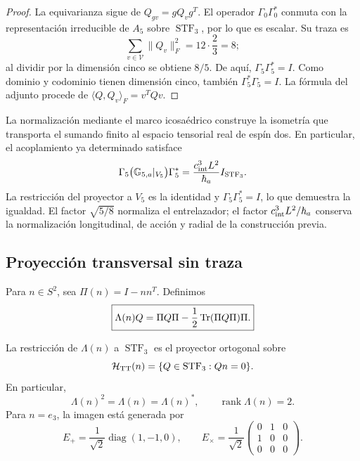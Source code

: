 \begin{proof}
La equivarianza sigue de \(Q_{gv}=gQ_vg^T\). El operador
\(\Gamma_0\Gamma_0^*\) conmuta con la representaci\'on irreducible de
\(A_5\) sobre \(\operatorname{STF}_3\), por lo que es escalar. Su traza
es
\[
\sum_{v\in\mathcal V}\|Q_v\|_F^2
=12\cdot\frac23=8;
\]
al dividir por la dimensi\'on cinco se obtiene \(8/5\). De aqu\'i,
\(\Gamma_5\Gamma_5^*=I\). Como dominio y codominio tienen dimensi\'on
cinco, tambi\'en \(\Gamma_5^*\Gamma_5=I\). La f\'ormula del adjunto
procede de \(\langle Q,Q_v\rangle_F=v^TQv\).
\end{proof}

La normalización mediante el marco icosaédrico construye la isometría que
transporta el sumando finito al espacio tensorial real de espín dos.
En particular, el acoplamiento ya determinado satisface
\begin{equation}
 \Gamma_5\bigl(\mathbb G_{5,a}|_{V_5}\bigr)\Gamma_5^*
 =\frac{c_{\rm int}^3L^2}{\hbar_a}I_{\operatorname{STF}_3}.
 \label{eq:ii-g26-normalizacion-tensorial}
\end{equation}
La restricción del proyector a \(V_5\) es la identidad y
\(\Gamma_5\Gamma_5^*=I\), lo que demuestra la igualdad. El factor
\(\sqrt{5/8}\) normaliza el entrelazador; el factor
\(c_{\rm int}^3L^2/\hbar_a\) conserva la normalización longitudinal,
de acción y radial de la construcción previa.

\subsection{Proyecci\'on transversal sin traza}

Para \(n\in S^2\), sea \(\Pi(n)=I-nn^T\). Definimos
\begin{equation}
\label{ii:pent:eq:gravity-lambda-tt}
\boxed{
\Lambda(n)Q
=\Pi Q\Pi-\frac12\operatorname{Tr}(\Pi Q\Pi)\Pi.}
\end{equation}

\begin{theorem}
\label{ii:pent:thm:gravity-tt}
La restricci\'on de \(\Lambda(n)\) a \(\operatorname{STF}_3\) es el
proyector ortogonal sobre
\begin{equation}
\label{ii:pent:eq:gravity-htt}
\mathcal H_{\rm TT}(n)
=\{Q\in\operatorname{STF}_3:Qn=0\}.
\end{equation}
En particular,
\begin{equation}
\label{ii:pent:eq:gravity-lambda-properties}
\Lambda(n)^2=\Lambda(n)=\Lambda(n)^*,
\qquad \operatorname{rank}\Lambda(n)=2.
\end{equation}
Para \(n=e_3\), la imagen est\'a generada por
\begin{equation}
\label{ii:pent:eq:gravity-plus-cross}
E_+=\frac1{\sqrt2}\operatorname{diag}(1,-1,0),
\qquad
E_\times=\frac1{\sqrt2}
\begin{pmatrix}0&1&0\\1&0&0\\0&0&0\end{pmatrix}.
\end{equation}
\end{theorem}

